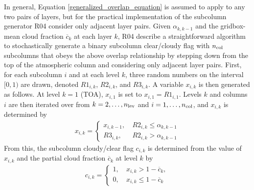 In general, Equation \ref{generalized_overlap_equation} is assumed to apply to any two pairs of layers, but for the practical implementation of the subcolumn generator R04 consider only adjacent layer pairs. Given $\alpha_{k, k-1}$ and the gridbox-mean cloud fraction $\overline{c}_{k}$ at each layer $k$, R04 describe a straightforward algorithm to stochastically generate a binary subcolumn clear/cloudy flag with $n_{\rm col}$ subcolumns that obeys the above overlap relationship by stepping down from the top of the atmospheric column and considering only adjacent layer pairs. First, for each subcolumn $i$ and at each level $k$, three random numbers on the interval $[0, 1)$ are drawn, denoted $R1_{i, k}$, $R2_{i, k}$, and $R3_{i, k}$. A variable $x_{i, k}$ is then generated as follows. At level $k = 1$ (TOA), $x_{i, 1}$ is set to $x_{i, 1} = R1_{i, 1}$. Levels $k$ and columns $i$ are then iterated over from $k = 2, \ldots, n_{\rm lev}$ and $i = 1, \ldots, n_{\rm col}$, and $x_{i, k}$ is determined by
\begin{gather}
    x_{i, k} = \begin{cases} 
        x_{i, k-1}, ~ & R2_{i, k} \le \alpha_{k, k-1} \\
        R3_{i, k}, ~ & R2_{i, k} > \alpha_{k, k-1}
    \end{cases}
\end{gather}
From this, the subcolumn cloudy/clear flag $c_{i, k}$ is determined from the value of $x_{i, k}$ and the partial cloud fraction $\overline{c}_{k}$ at level $k$ by
\begin{gather}
    c_{i, k} = \begin{cases}
        1, ~ & x_{i, k} > 1 - \overline{c}_{k}, \\
        0, ~ & x_{i, k} \le 1 - \overline{c}_{k}
    \end{cases}
\end{gather}

